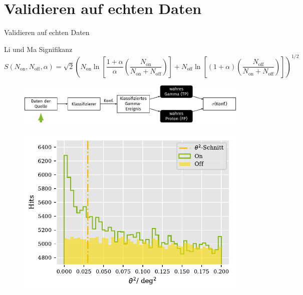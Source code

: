 \documentclass[aspectratio=1610, professionalfonts, 9pt]{beamer}
\begin{document}
\section{Validieren auf echten Daten}

\begin{frame}{Validieren auf echten Daten}
	\begin{block}{Li und Ma Signifikanz}
	  \begin{equation*}
		S\left( N_\text{on}, N_\text{off}, \alpha \right) = \sqrt{2} \left( N_\text{on} \ln \left[ \frac{1+ \alpha}{\alpha}\left( \frac{N_\text{on}}{N_\text{on} + N_\text{off}} \right) \right] + N_\text{off} \ln \left[ \left( 1+ \alpha \right) \left( \frac{N_\text{off}}{N_\text{on} + N_\text{off}} \right) \right] \right)^{1/2}
	  \end{equation*}
	\end{block}
\end{frame}

\begin{frame}
  \begin{minipage}[t][0.3\textheight][t]{\textwidth}
	  \begin{figure}
		\includegraphics[scale=0.5]{./tikz/Conf/Conf1.pdf}
	  \end{figure}
  \end{minipage}
  \begin{minipage}[t][0.7\textheight][t]{\textwidth}
	  \begin{figure}
		\centering
		\includegraphics[height=0.7\textheight]{./Plots/on_off_ratio.pdf}
	  \end{figure}
  \end{minipage}
\end{frame}
\end{document}
